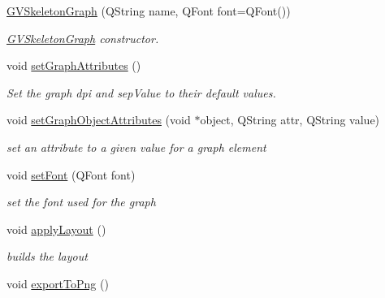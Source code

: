 \begin{DoxyCompactItemize}
\item 
\hyperlink{classGVSkeletonGraph_aff5ae5626bd75ccbb40d54117d6ba379}{G\+V\+Skeleton\+Graph} (Q\+String name, Q\+Font font=Q\+Font())
\begin{DoxyCompactList}\small\item\em \hyperlink{classGVSkeletonGraph}{G\+V\+Skeleton\+Graph} constructor. \end{DoxyCompactList}\item 
\hypertarget{classGVSkeletonGraph_aecb6a116fbb734089ef01ab78580d2d3}{void \hyperlink{classGVSkeletonGraph_aecb6a116fbb734089ef01ab78580d2d3}{set\+Graph\+Attributes} ()}\label{classGVSkeletonGraph_aecb6a116fbb734089ef01ab78580d2d3}

\begin{DoxyCompactList}\small\item\em Set the graph dpi and sep\+Value to their default values. \end{DoxyCompactList}\item 
void \hyperlink{classGVSkeletonGraph_ae47e7e33a02a94658be0ab3c950172bc}{set\+Graph\+Object\+Attributes} (void $\ast$object, Q\+String attr, Q\+String value)
\begin{DoxyCompactList}\small\item\em set an attribute to a given value for a graph element \end{DoxyCompactList}\item 
void \hyperlink{classGVSkeletonGraph_a14ce57fdd94f4f5996af8be2476bf76b}{set\+Font} (Q\+Font font)
\begin{DoxyCompactList}\small\item\em set the font used for the graph \end{DoxyCompactList}\item 
\hypertarget{classGVSkeletonGraph_ade966198333d6aef5f5f56a9849488c9}{void \hyperlink{classGVSkeletonGraph_ade966198333d6aef5f5f56a9849488c9}{apply\+Layout} ()}\label{classGVSkeletonGraph_ade966198333d6aef5f5f56a9849488c9}

\begin{DoxyCompactList}\small\item\em builds the layout \end{DoxyCompactList}\item 
\hypertarget{classGVSkeletonGraph_a53073d1aaae9c5ec6a9dfa04ceb9151b}{void \hyperlink{classGVSkeletonGraph_a53073d1aaae9c5ec6a9dfa04ceb9151b}{export\+To\+Png} ()}\label{classGVSkeletonGraph_a53073d1aaae9c5ec6a9dfa04ceb9151b}


\end{DoxyCompactItemize}
